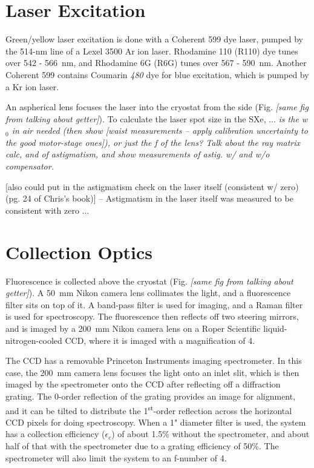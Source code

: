 \section{Laser Excitation}

Green/yellow laser excitation is done with a Coherent 599 dye laser, pumped by the 514-nm line of a Lexel 3500 Ar ion laser.  Rhodamine 110 (R110) dye tunes over 542 - 566~nm, and Rhodamine 6G (R6G) tunes over 567 - 590~nm.  Another Coherent 599 contains Coumarin \emph{\color{red}480} dye for blue excitation, which is pumped by a Kr ion laser.

An aspherical lens focuses the laser into the cryostat from the side (Fig. \emph{\color{red}[same fig from talking about getter]}).  To calculate the laser spot size in the SXe, ... \emph{\color{red}is the w$_{0}$ in air needed (then show [waist measurements -- apply calibration uncertainty to the good motor-stage ones]), or just the f of the lens?  Talk about the ray matrix calc, and of astigmatism, and show measurements of astig. w/ and w/o compensator.}

[also could put in the astigmatism check on the laser itself (consistent w/ zero) (pg. 24 of Chris's book)] -- Astigmatism in the laser itself was measured to be consistent with zero ...

\section{Collection Optics}

Fluorescence is collected above the cryostat (Fig. \emph{\color{red}[same fig from talking about getter]}).  A 50~mm Nikon camera lens collimates the light, and a fluorescence filter sits on top of it.  A band-pass filter is used for imaging, and a Raman filter is used for spectroscopy.  The fluorescence then reflects off two steering mirrors, and is imaged by a 200~mm Nikon camera lens on a Roper Scientific liquid-nitrogen-cooled CCD, where it is imaged with a magnification of 4.

The CCD has a removable Princeton Instruments imaging spectrometer.  In this case, the 200~mm camera lens focuses the light onto an inlet slit, which is then imaged by the spectrometer onto the CCD after reflecting off a diffraction grating.  The 0-order reflection of the grating provides an image for alignment, and it can be tilted to distribute the 1\textsuperscript{st}-order reflection across the horizontal CCD pixels for doing spectroscopy.  When a 1" diameter filter is used, the system has a collection efficiency ($\epsilon_{c}$) of about 1.5\% without the spectrometer, and about half of that with the spectrometer due to a grating efficiency of 50\%.  The spectrometer will also limit the system to an f-number of 4.

